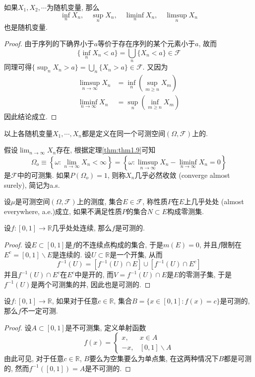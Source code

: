 \documentclass[cn, 12pt, math=mtpro2, bibstyle=apa, blue, twocol]{elegantbook}
\newcommand{\F}{\mathcal{F}}
\newcommand{\R}{\mathbb{R}}
\newcommand{\PP}{P}
\newcommand{\limn}{\lim_{n\to\infty}}
\begin{document}
\begin{theorem}\label{thm:thm1.9}
  如果$X_1,X_2,\cdots$为随机变量, 那么
  $$\inf_n X_n,\quad  \sup_nX_n,\quad \liminf_nX_n, \quad \limsup_nX_n$$
  也是随机变量.
\end{theorem}
\begin{proof}
  由于序列的下确界小于$a$等价于存在序列的某个元素小于$a$, 故而
  $$\{\inf_nX_n<a\}=\textstyle\bigcup_n\{X_n<a\}\in\F$$
  同理可得$\{\sup_nX_n>a\}=\bigcup_n\{X_n>a\}\in\F$. 又因为
  \begin{align*}
  \limsup_{n\to\infty}X_n&=\inf_n\left(\sup_{m\geq n}X_m\right) \\
  \liminf_{n\to\infty}X_n&=\sup_n\left(\inf_{m\geq n}X_m\right)
  \end{align*}
  因此结论成立.
\end{proof}

\begin{remark}
以上各随机变量$X_1,\cdots,X_n$都是定义在同一个可测空间$(\Omega,\F)$上的.
\end{remark}

假设$\limn X_n$存在, 根据定理\ref{thm:thm1.9}可知
$$\Omega_o\equiv\left\{\omega: \limn X_n<\infty\right\}=\left\{\omega:\limsup_{n\to\infty}X_n-\liminf_{n\to\infty}X_n=0\right\}$$
是$\F$中的可测集. 如果$\PP(\Omega_o)=1$, 则称$X_n$几乎必然收敛 (converge almost surely), 简记为a.s.

\begin{definition}
设$\mu$是可测空间$(\Omega,\F)$上的测度, 集合$E\in\F$, 称性质$P$在$E$上几乎处处 (almost everywhere, a.e.)成立, 如果不满足性质$P$的集合$N\subset E$构成零测集.
\end{definition}

\begin{example}
设$f:[0,1]\to \R$几乎处处连续, 那么$f$是可测的.
\end{example}
\begin{proof}
  设$E\subset [0,1]$是$f$的不连续点构成的集合, 于是$m(E)=0$, 并且$f$限制在$E^c=[0,1]\backslash E$是连续的. 设$U\subset \R$是一个开集, 从而
  $$f^{-1}(U)=[f^{-1}(U)\cap E]\cup [f^{-1}(U)\cap E^c]$$
  并且$f^{-1}(U)\cap E^c$在$E^c$中是开的, 而$V=f^{-1}(U)\cap E$是$E$的零测子集, 于是$f^{-1}(U)$是两个可测集的并, 因此也是可测的.
\end{proof}

\begin{example}
设$f:[0,1]\to\R$, 如果对于任意$c\in\R$, 集合$B=\{x\in[0,1]: f(x)=c\}$是可测的, 那么$f$不一定可测.
\end{example}
\begin{proof}
  设$A\subset [0,1]$是不可测集, 定义单射函数
  $$f(x)=\begin{cases}
           x, & x\in A \\
           -x, & [0,1]\backslash A
         \end{cases}$$
  由此可见, 对于任意$c\in\R$, $B$要么为空集要么为单点集, 在这两种情况下$B$都是可测的, 然而$f^{-1}([0,1])=A$是不可测的.
\end{proof}
\end{document}
